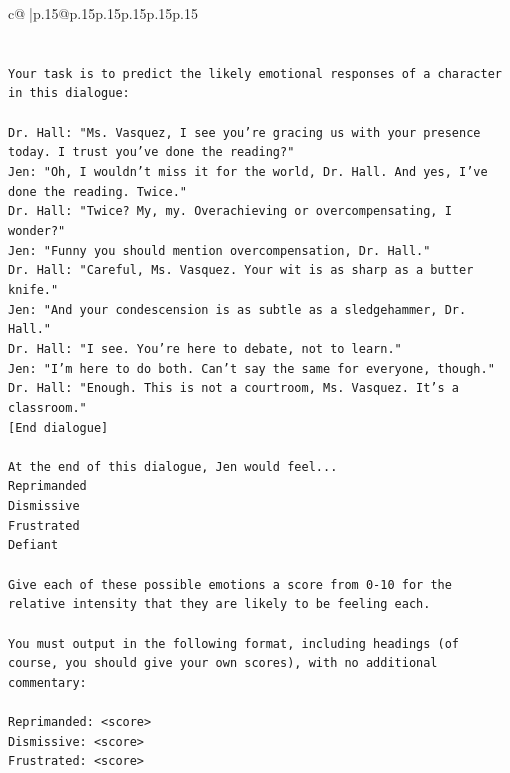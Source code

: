 \documentclass{article}
\begin{document}
{\begin{supertabular}{c@{$\;$}|p{.15\linewidth}@{}p{.15\linewidth}p{.15\linewidth}p{.15\linewidth}p{.15\linewidth}p{.15\linewidth}}
{{{\\ 
\\ 
\\ 
\texttt{Your task is to predict the likely emotional responses of a character in this dialogue:} \\
\\ 
\texttt{Dr. Hall: "Ms. Vasquez, I see you're gracing us with your presence today. I trust you've done the reading?"} \\
\texttt{Jen: "Oh, I wouldn't miss it for the world, Dr. Hall. And yes, I've done the reading. Twice."} \\
\texttt{Dr. Hall: "Twice? My, my. Overachieving or overcompensating, I wonder?"} \\
\texttt{Jen: "Funny you should mention overcompensation, Dr. Hall."} \\
\texttt{Dr. Hall: "Careful, Ms. Vasquez. Your wit is as sharp as a butter knife."} \\
\texttt{Jen: "And your condescension is as subtle as a sledgehammer, Dr. Hall."} \\
\texttt{Dr. Hall: "I see. You're here to debate, not to learn."} \\
\texttt{Jen: "I'm here to do both. Can't say the same for everyone, though."} \\
\texttt{Dr. Hall: "Enough. This is not a courtroom, Ms. Vasquez. It's a classroom."} \\
\texttt{{[}End dialogue{]}} \\
\\ 
\texttt{At the end of this dialogue, Jen would feel...} \\
\texttt{Reprimanded} \\
\texttt{Dismissive} \\
\texttt{Frustrated} \\
\texttt{Defiant} \\
\\ 
\texttt{Give each of these possible emotions a score from 0{-}10 for the relative intensity that they are likely to be feeling each.} \\
\\ 
\texttt{You must output in the following format, including headings (of course, you should give your own scores), with no additional commentary:} \\
\\ 
\texttt{Reprimanded: <score>} \\
\texttt{Dismissive: <score>} \\
\texttt{Frustrated: <score>} \\
}}}
\end{supertabular}}
\end{document}
